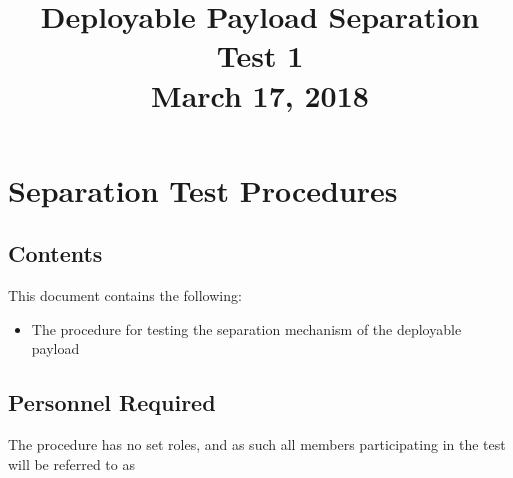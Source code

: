 

\title{
\Huge Deployable Payload Separation Test 1\\
\vspace{1cm}
\Large March 17, 2018}








\section{Separation Test Procedures}


\subsection{Contents}
This document contains the following:
\begin{itemize}
    \item The procedure for testing the separation mechanism of the deployable payload
\end{itemize}

\subsection{Personnel Required}
The procedure has no set roles, and as such all members participating in the test will be referred to as \auth


